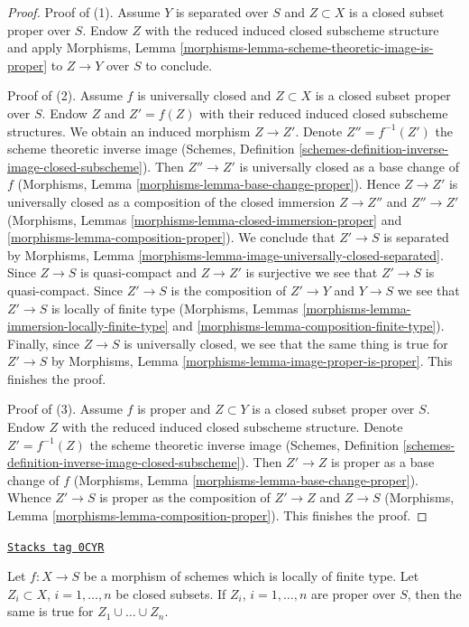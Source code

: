 \begin{proof}
Proof of (1). Assume $Y$ is separated over $S$ and $Z \subset X$
is a closed subset proper over $S$. Endow $Z$ with the reduced induced
closed subscheme structure and apply
Morphisms, Lemma \ref{morphisms-lemma-scheme-theoretic-image-is-proper}
to $Z \to Y$ over $S$ to conclude.

\medskip\noindent
Proof of (2). Assume $f$ is universally closed and $Z \subset X$ is a
closed subset proper over $S$. Endow $Z$ and $Z' = f(Z)$ with their reduced
induced closed subscheme structures. We obtain an induced
morphism $Z \to Z'$.
Denote $Z'' = f^{-1}(Z')$ the scheme theoretic inverse image
(Schemes, Definition \ref{schemes-definition-inverse-image-closed-subscheme}).
Then $Z'' \to Z'$ is universally closed as a base change of $f$
(Morphisms, Lemma \ref{morphisms-lemma-base-change-proper}).
Hence $Z \to Z'$ is universally closed as a composition of
the closed immersion $Z \to Z''$ and $Z'' \to Z'$
(Morphisms, Lemmas
\ref{morphisms-lemma-closed-immersion-proper} and
\ref{morphisms-lemma-composition-proper}).
We conclude that $Z' \to S$ is separated by
Morphisms, Lemma \ref{morphisms-lemma-image-universally-closed-separated}.
Since $Z \to S$ is quasi-compact and $Z \to Z'$ is surjective
we see that $Z' \to S$ is quasi-compact.
Since $Z' \to S$ is the composition of $Z' \to Y$ and $Y \to S$
we see that $Z' \to S$ is locally of finite type
(Morphisms, Lemmas \ref{morphisms-lemma-immersion-locally-finite-type} and
\ref{morphisms-lemma-composition-finite-type}).
Finally, since $Z \to S$ is universally closed, we see that
the same thing is true for $Z' \to S$ by
Morphisms, Lemma \ref{morphisms-lemma-image-proper-is-proper}.
This finishes the proof.

\medskip\noindent
Proof of (3). Assume $f$ is proper and $Z \subset Y$ is a closed subset
proper over $S$. Endow $Z$ with the reduced induced closed subscheme
structure. Denote $Z' = f^{-1}(Z)$ the scheme theoretic inverse image
(Schemes, Definition \ref{schemes-definition-inverse-image-closed-subscheme}).
Then $Z' \to Z$ is proper as a base change of $f$
(Morphisms, Lemma \ref{morphisms-lemma-base-change-proper}).
Whence $Z' \to S$ is proper as the composition of $Z' \to Z$
and $Z \to S$
(Morphisms, Lemma \ref{morphisms-lemma-composition-proper}).
This finishes the proof.
\end{proof}

\begin{lemma}
\label{coherent-lemma-union-closed-proper-over-base}
\href{https://stacks.math.columbia.edu/tag/0CYR}{\texttt{Stacks tag 0CYR}}

Let $f : X \to S$ be a morphism of schemes which is locally of finite type.
Let $Z_i \subset X$, $i = 1, \ldots, n$ be closed subsets.
If $Z_i$, $i = 1, \ldots, n$ are proper over $S$, then the same is
true for $Z_1 \cup \ldots \cup Z_n$.
\end{lemma}


